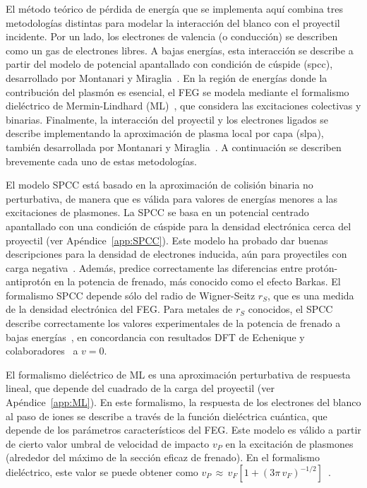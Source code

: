 El método teórico de pérdida de energía que se implementa aquí combina 
tres metodologías distintas para modelar la interacción del blanco con 
el proyectil incidente. Por un lado, los electrones de valencia (o 
conducción) se describen como un gas de electrones libres. A bajas 
energías, esta interacción se describe a partir del modelo de potencial
apantallado con condición de cúspide (\acs{spcc}), desarrollado por 
Montanari y Miraglia~\cite{Montanari:17}. En la región de energías donde 
la contribución del plasmón es esencial, el FEG se modela mediante el 
formalismo dieléctrico de Mermin-Lindhard (ML)~\cite{Mermin:70}, que 
considera las excitaciones colectivas y binarias. Finalmente, la 
interacción del proyectil y los electrones ligados se describe 
implementando la aproximación de plasma local por capa 
(\acs{slpa}), también desarrollada por Montanari y 
Miraglia~\cite{Montanari:17,Montanari:13}. A continuación se describen 
brevemente cada uno de estas metodologías. 

El modelo SPCC está basado en la aproximación de colisión binaria no 
perturbativa, de manera que es válida para valores de energías menores a 
las excitaciones de plasmones. La SPCC se basa en un potencial centrado 
apantallado con una condición de cúspide para la densidad electrónica 
cerca del proyectil (ver Apéndice~\ref{app:SPCC}). Este modelo ha 
probado dar buenas descripciones para la densidad de electrones inducida, 
aún para proyectiles con carga negativa~\cite{Montanari:17}. 
Además, predice correctamente las diferencias entre protón-antiprotón en 
la potencia de frenado, más conocido como el efecto Barkas. El 
formalismo SPCC depende sólo del radio de Wigner-Seitz $r_S$, que es una 
medida de la densidad electrónica del FEG. Para metales de $r_S$ 
conocidos, el SPCC describe correctamente los valores experimentales de 
la potencia de frenado a bajas energías~\cite{Montanari:17}, en 
concordancia con resultados DFT de Echenique y 
colaboradores~\cite{Echenique:81,Nagy:89} a $v=0$.

El formalismo dieléctrico de ML es una aproximación perturbativa de 
respuesta lineal, que depende del cuadrado de la carga del proyectil 
(ver Apéndice~\ref{app:ML}). En este formalismo, la respuesta de los 
electrones del blanco al paso de iones se describe a través de la 
función dieléctrica cuántica, que depende de los parámetros 
característicos del FEG. Este modelo es válido a partir de cierto valor 
umbral de velocidad de impacto $v_P$ en la excitación de plasmones 
(alrededor del máximo de la sección eficaz de frenado). En el formalismo 
dieléctrico, este valor se puede obtener como 
$v_P\,\approx\,v_F[1+(3\pi\,v_F)^{-1/2}]$~\cite{suppression}. 

